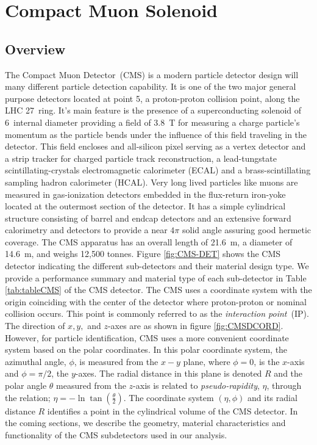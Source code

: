 \clearpage

\section{Compact Muon Solenoid}
\subsection{Overview}
The Compact Muon Detector~(CMS) is a modern particle detector design will many different particle detection capability.
It is one of the two major general purpose detectors located at point 5, a proton-proton collision point, along the LHC 27~\km ring.
It's main feature is the presence of a superconducting solenoid of 6~\m internal diameter providing a field of 3.8~T for measuring a charge particle's momentum as the particle bends under the influence of this field traveling in the detector.
This field  encloses and all-silicon pixel serving as a vertex detector and a strip tracker for charged particle track reconstruction, a lead-tungstate scintillating-crystals electromagnetic calorimeter (ECAL) and a brass-scintillating sampling hadron calorimeter (HCAL). Very long lived particles like muons are measured in gas-ionization detectors embedded in the flux-return iron-yoke located at the outermost section of the detector.
It has a simple cylindrical structure consisting of barrel and endcap detectors and an extensive forward calorimetry and detectors to provide a near $4\pi$ solid angle assuring good hermetic coverage. The CMS apparatus has an overall length of 21.6~m, a diameter of 14.6~m, and weighs 12,500 tonnes. Figure \ref{fig:CMS-DET} shows the CMS detector indicating the different sub-detectors and their 
material design type. We provide a performance summary and  material type of each sub-detector in Table \ref{tab:tableCMS} of the CMS detector.
The CMS uses a coordinate system with the origin coinciding with the center of the detector where proton-proton or nominal collision 
occurs. This point is commonly referred to as the \textit{interaction point}~(IP). The direction of $x,y,$ and $z$-axes are as shown in figure \ref{fig:CMSDCORD}. However, for particle identification, CMS uses a more convenient coordinate system based on the polar coordinates. In this polar coordinate system, the azimuthal angle, $\phi$, is measured from the $x-y$ plane, where $\phi = 0$, is the $x$-axis and $\phi = \pi/2 $, the $y$-axes. The radial distance in this plane is denoted $R$ and the polar angle $\theta$  measured from the $z$-axis is related to \textit{pseudo-rapidity}, $\eta$, through the relation; $\eta = -\ln \tan(\frac{\theta} {2}) $. 
The coordinate system $(\eta, \phi)$ and its radial distance $R$ identifies a point in the cylindrical volume of the CMS detector. 
In the coming sections, we describe the geometry, material characteristics and functionality of the CMS subdetectors  used in our analysis.

